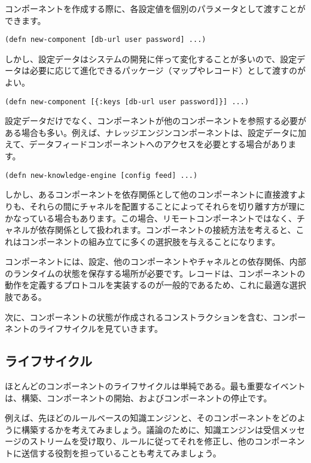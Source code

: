 コンポーネントを作成する際に、各設定値を個別のパラメータとして渡すことができます。

\begin{lstlisting}[numbers=none]
(defn new-component [db-url user password] ...)
\end{lstlisting}

しかし、設定データはシステムの開発に伴って変化することが多いので、設定データは必要に応じて進化できるパッケージ（マップやレコード）として渡すのがよい。

\begin{lstlisting}[numbers=none]
(defn new-component [{:keys [db-url user password]}] ...)
\end{lstlisting}

設定データだけでなく、コンポーネントが他のコンポーネントを参照する必要がある場合も多い。例えば、ナレッジエンジンコンポーネントは、設定データに加えて、データフィードコンポーネントへのアクセスを必要とする場合があります。

\begin{lstlisting}[numbers=none]
(defn new-knowledge-engine [config feed] ...)
\end{lstlisting}

しかし、あるコンポーネントを依存関係として他のコンポーネントに直接渡すよりも、それらの間にチャネルを配置することによってそれらを切り離す方が理にかなっている場合もあります。この場合、リモートコンポーネントではなく、チャネルが依存関係として扱われます。コンポーネントの接続方法を考えると、これはコンポーネントの組み立てに多くの選択肢を与えることになります。

コンポーネントには、設定、他のコンポーネントやチャネルとの依存関係、内部のランタイムの状態を保存する場所が必要です。レコードは、コンポーネントの動作を定義するプロトコルを実装するのが一般的であるため、これに最適な選択肢である。

次に、コンポーネントの状態が作成されるコンストラクションを含む、コンポーネントのライフサイクルを見ていきます。

\subsection{ライフサイクル}

ほとんどのコンポーネントのライフサイクルは単純である。最も重要なイベントは、構築、コンポーネントの開始、およびコンポーネントの停止です。

例えば、先ほどのルールベースの知識エンジンと、そのコンポーネントをどのように構築するかを考えてみましょう。議論のために、知識エンジンは受信メッセージのストリームを受け取り、ルールに従ってそれを修正し、他のコンポーネントに送信する役割を担っていることも考えてみましょう。

